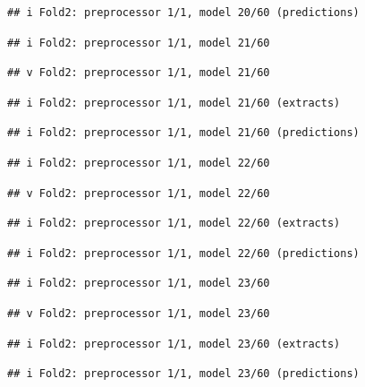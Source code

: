 \documentclass[
]{article}
\begin{document}
\begin{verbatim}
## i Fold2: preprocessor 1/1, model 20/60 (predictions)
\end{verbatim}

\begin{verbatim}
## i Fold2: preprocessor 1/1, model 21/60
\end{verbatim}

\begin{verbatim}
## v Fold2: preprocessor 1/1, model 21/60
\end{verbatim}

\begin{verbatim}
## i Fold2: preprocessor 1/1, model 21/60 (extracts)
\end{verbatim}

\begin{verbatim}
## i Fold2: preprocessor 1/1, model 21/60 (predictions)
\end{verbatim}

\begin{verbatim}
## i Fold2: preprocessor 1/1, model 22/60
\end{verbatim}

\begin{verbatim}
## v Fold2: preprocessor 1/1, model 22/60
\end{verbatim}

\begin{verbatim}
## i Fold2: preprocessor 1/1, model 22/60 (extracts)
\end{verbatim}

\begin{verbatim}
## i Fold2: preprocessor 1/1, model 22/60 (predictions)
\end{verbatim}

\begin{verbatim}
## i Fold2: preprocessor 1/1, model 23/60
\end{verbatim}

\begin{verbatim}
## v Fold2: preprocessor 1/1, model 23/60
\end{verbatim}

\begin{verbatim}
## i Fold2: preprocessor 1/1, model 23/60 (extracts)
\end{verbatim}

\begin{verbatim}
## i Fold2: preprocessor 1/1, model 23/60 (predictions)
\end{verbatim}
\end{document}
